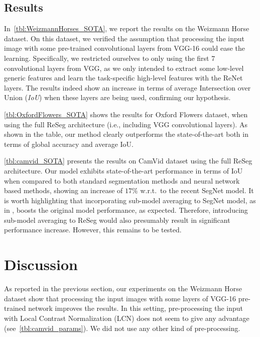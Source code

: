\documentclass[times,art10,twocolumn,latex8]{article}
\begin{document}
\subsection{Results}

In~\autoref{tbl:WeizmannHorses_SOTA}, we report the results on the Weizmann
Horse dataset. On this dataset, we verified the assumption that processing
the input image with some pre-trained convolutional layers from VGG-16 could
ease the learning. Specifically, we restricted ourselves to only using the
first $7$ convolutional layers from VGG, as we only intended to extract some
low-level generic features and learn the task-specific high-level features with
the ReNet layers. The results indeed show an increase in terms of average Intersection
over Union (\emph{IoU}) when these layers are being used, confirming our
hypothesis.

\autoref{tbl:OxfordFlowers_SOTA} shows the results for Oxford Flowers
dataset, when using the full ReSeg architecture (i.e., including VGG convolutional layers).
As shown in the table, our method clearly outperforms the
state-of-the-art both in terms of global accuracy and average IoU.

\autoref{tbl:camvid_SOTA} presents the results on CamVid dataset using the full
ReSeg architecture. Our model exhibits state-of-the-art performance in terms of
IoU when compared to both standard segmentation methods and neural network
based methods, showing an increase of $17\%$ w.r.t.\ to the recent SegNet
model. It is worth highlighting that incorporating sub-model averaging to
SegNet model, as in \cite{Kendall2015bayesiansegnet}, boosts the original model
performance, as expected. Therefore, introducing sub-model averaging to ReSeg
would also presumably result in significant performance increase.  However,
this remains to be tested.







\section{Discussion}

As reported in the previous section, our experiments on the Weizmann Horse
dataset show that processing the input images with some layers of VGG-16
pre-trained network improves the results. In this setting, pre-processing the input
with Local Contrast Normalization (LCN) does not seem to give any advantage
(see~\autoref{tbl:camvid_params}). We did not use any other kind of
pre-processing.
\end{document}
